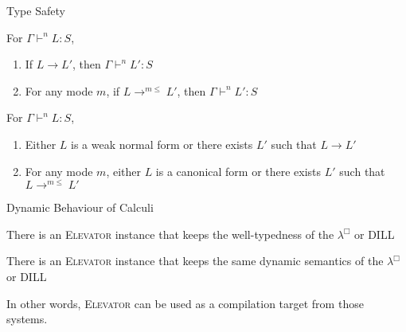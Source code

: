 \documentclass[letterpaper,12pt,aspectratio=169,show notes,dvipsnames]{beamer}
\newcommand{\elevator}{\textsc{Elevator}\xspace}
\newcommand{\modeSpec}{\mathcal{M}}
\newcommand{\modeOrdLe}[1][\modeSpec]{\le^{#1}}
\newcommand{\wknorm}[1]{\mathsf{WeakNorm}~(#1)}
\newcommand{\wf}[1]{\mathsf{wf}~(#1)}
\newcommand{\judg}[1]{\vdash^{#1}}
\newcommand{\equivMod}[6]{#1 \judg{#2} #4 \approx^{#3} #5 : #6}
\begin{document}
\begin{frame}{Type Safety}
  \color{black}
  \begin{theorem}
    For \(\Gamma \judg{n} L : S\),
    \begin{enumerate}
    \item If\/ \(L \longrightarrow L'\), then \(\Gamma \judg{n} L' : S\)
    \item For any mode \(m\), if\/ \(L \longrightarrow^{m\le} L'\), then \(\Gamma \judg{n} L' : S\)
    \end{enumerate}
  \end{theorem}
  \pause
  \begin{theorem}[Progress]
    For \(\Gamma \judg{n} L : S\),
    \begin{enumerate}
    \item Either \(L\) is a weak normal form or there exists \(L'\) such that \(L \longrightarrow L'\)
    \item For any mode \(m\), either \(L\) is a canonical form or there exists \(L'\) such that \(L \longrightarrow^{m\le} L'\)
    \end{enumerate}
  \end{theorem}
\end{frame}


\begin{frame}{Dynamic Behaviour of Calculi}
  \begin{theorem}
    There is an \elevator instance that keeps the well-typedness of the \(\lambda^{\Box}\) or DILL
  \end{theorem}
  \begin{theorem}[Bisimulation]
    There is an \elevator instance that keeps the same dynamic semantics of the \(\lambda^{\Box}\) or DILL
  \end{theorem}
  \pause
  In other words, \elevator can be used as a compilation target from those systems.
\end{frame}
\end{document}
